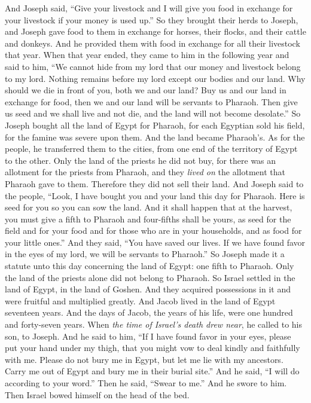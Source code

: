 \begin{biblechapter}
\verse And Joseph said, “Give your livestock and I will give you food in exchange for your livestock if your money is used up.”
\verse So they brought their herds to Joseph, and Joseph gave food to them in exchange for horses, their flocks, and their cattle and donkeys. And he provided them with food in exchange for all their livestock that year.
\verse When that year ended, they came to him in the following year and said to him, “We cannot hide from my lord that our money and livestock belong to my lord. Nothing remains before my lord except our bodies and our land.
\verse Why should we die in front of you, both we and our land? Buy us and our land in exchange for food, then we and our land will be servants to Pharaoh. Then give us seed and we shall live and not die, and the land will not become desolate.”
\verse So Joseph bought all the land of Egypt for Pharaoh, for each Egyptian sold his field, for the famine was severe upon them. And the land became Pharaoh’s.
\verse As for the people, he transferred them to the cities, from one end of the territory of Egypt to the other.
\verse Only the land of the priests he did not buy, for there was an allotment for the priests from Pharaoh, and they \textit{lived on} the allotment that Pharaoh gave to them. Therefore they did not sell their land.
\verse And Joseph said to the people, “Look, I have bought you and your land this day for Pharaoh. Here is seed for you so you can sow the land.
\verse And it shall happen that at the harvest, you must give a fifth to Pharaoh and four-fifths shall be yours, as seed for the field and for your food and for those who are in your households, and as food for your little ones.”
\verse And they said, “You have saved our lives. If we have found favor in the eyes of my lord, we will be servants to Pharaoh.”
\verse So Joseph made it a statute unto this day concerning the land of Egypt: one fifth to Pharaoh. Only the land of the priests alone did not belong to Pharaoh.
\verse So Israel settled in the land of Egypt, in the land of Goshen. And they acquired possessions in it and were fruitful and multiplied greatly.
\verse And Jacob lived in the land of Egypt seventeen years. And the days of Jacob, the years of his life, were one hundred and forty-seven years.
\verse When \textit{the time of Israel’s death drew near}, he called to his son, to Joseph. And he said to him, “If I have found favor in your eyes, please put your hand under my thigh, that you might vow to deal kindly and faithfully with me. Please do not bury me in Egypt,
\verse but let me lie with my ancestors. Carry me out of Egypt and bury me in their burial site.” And he said, “I will do according to your word.”
\verse Then he said, “Swear to me.” And he swore to him. Then Israel bowed himself on the head of the bed.
\end{biblechapter}

